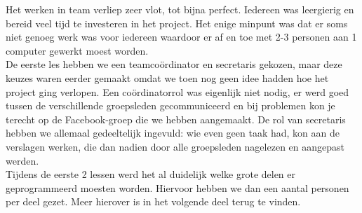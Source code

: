 \documentclass[eind]{penoverslag}
\begin{document}
\begin{itemize}
Het werken in team verliep zeer vlot, tot bijna perfect. Iedereen was leergierig en bereid veel tijd te investeren in het project. Het enige minpunt was dat er soms niet genoeg werk was voor iedereen waardoor er af en toe met 2-3 personen aan 1 computer gewerkt moest worden. \\
De eerste les hebben we een teamco\"ordinator en secretaris gekozen, maar deze keuzes waren eerder gemaakt omdat we toen nog geen idee hadden hoe het project ging verlopen. Een co\"ordinatorrol was eigenlijk niet nodig, er werd goed tussen de verschillende groepsleden gecommuniceerd en bij problemen kon je terecht op de Facebook-groep die we hebben aangemaakt. De rol van secretaris hebben we allemaal gedeeltelijk ingevuld: wie even geen taak had, kon aan de verslagen werken, die dan nadien door alle groepsleden nagelezen en aangepast werden. \\ 
Tijdens de eerste 2 lessen werd het al duidelijk welke grote delen er geprogrammeerd moesten worden. Hiervoor hebben we dan een aantal personen per deel gezet.  Meer hierover is in het volgende deel terug te vinden.

\end{itemize}
\end{document}
